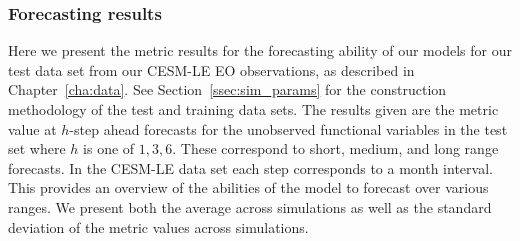 \begin{table}[htbp!] 
	\caption[CESM-LE results for interpolation by atmospheric components with various FTSM models]{CESM-LE results for interpolation by atmospheric components with various FTSM models. Bracketed values correspond to the standard deviation.}
	\centering
	\label{tab:ftsm_eo_interp}
\end{table}

\subsubsection{Forecasting results}
Here we present the metric results for the forecasting ability of our models for our test data set from our CESM-LE EO observations, as described in Chapter~\ref{cha:data}.
See Section~\ref{ssec:sim_params} for the construction methodology of the test and training data sets. 
The results given are the metric value at $h$-step ahead forecasts for the unobserved functional variables in the test set where $h$ is one of $1, 3, 6$. 
These correspond to short, medium, and long range forecasts.
In the CESM-LE data set each step corresponds to a month interval.
This provides an overview of the abilities of the model to forecast over various ranges.
We present both the average across simulations as well as the standard deviation of the metric values across simulations.

